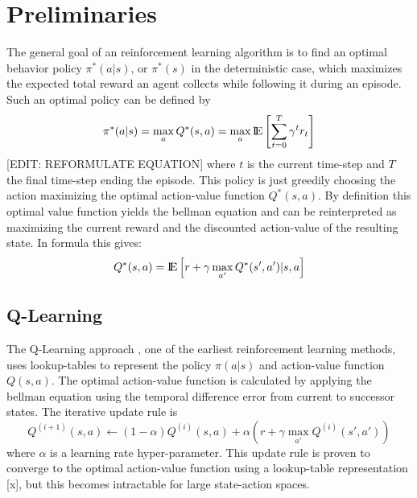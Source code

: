 \section{Preliminaries}
The general goal of an reinforcement learning algorithm is to find an optimal behavior policy $\pi^*(a|s)$, or $\pi^*(s)$ in the deterministic case, which maximizes the expected total reward an agent collects while following it during an episode. Such an optimal policy can be defined by 
\[ 
\pi^*(a|s)=\max_a Q^*(s,a)=\max_a {\rm I\!E} \left[
\sum_{t=0}^{T}\gamma^{t}r_t\right] 
\]
[EDIT: REFORMULATE EQUATION]
where $t$ is the current time-step and $T$ the final time-step ending the episode.
This policy is just greedily choosing the action maximizing the optimal action-value function $Q^*(s,a)$. By definition this optimal value function yields the bellman equation \citep{sutton2018reinforcement} and can be reinterpreted as maximizing the current reward and the discounted action-value of the resulting state. In formula this gives:
\[
Q^*(s,a) = {\rm I\!E} \left[
r + \gamma \max_{a'}Q^*(s',a')|s,a \right]
\]
\subsection{Q-Learning}
\label{sec:QLearning}
The Q-Learning approach \citep{watkins1992q}, one of the earliest reinforcement learning methods, uses lookup-tables to represent the policy $\pi(a|s)$ and action-value function $Q(s,a)$. The optimal action-value function is calculated by applying the bellman equation using the temporal difference error from current to successor states. The iterative update rule is 
\[
Q^{(i+1)}(s,a) \leftarrow (1-\alpha) Q^{(i)}(s,a) + \alpha \left( r + \gamma \max_{a'} Q^{(i)}(s',a') \right)
\]
where $\alpha$ is a learning rate hyper-parameter. This update rule is proven to converge to the optimal action-value function using a lookup-table representation [x], but this becomes intractable for large state-action spaces. 
